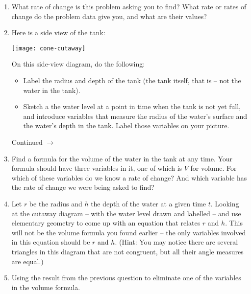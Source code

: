 \documentclass[11pt]{article}
\def\ra{\rightarrow}
\def\pageturn{\vfill 
\begin{flushright}
	\begin{small}
		Continued $\ra$
	\end{small}
\end{flushright} \newpage}
\begin{document}
	
\begin{enumerate}
	\item What rate of change is this problem asking you to find? What rate or rates of change do the problem data give you, and what are their values? 
	
	\vspace{0.7in}
	
	\item Here is a side view of the tank: 
\begin{center}
	\texttt{[image: cone-cutaway]}
\end{center}	
	
	
On this side-view diagram, do the following: 
	\begin{itemize}
		\item Label the radius and depth of the tank (the tank itself, that is -- not the water in the tank). 
		\item Sketch a the water level at a point in time when the tank is not yet full, and introduce variables that measure the radius of the water's surface and the water's depth in the tank. Label those variables on your picture. 
	\end{itemize}
	
	\pageturn

	
	\item Find a formula for the volume of the water in the tank at any time. Your formula should have three variables in it, one of which is $V$ for volume. For which of these variables do we know a rate of change? And which variable has the rate of change we were being asked to find? 
	
	\vspace{1in}
	
	\item Let $r$ be the radius and $h$ the depth of the water at a given time $t$. Looking at the cutaway diagram -- with the water level drawn and labelled -- and use elementary geometry to come up with an equation that relates $r$ and $h$. This will not be the volume formula you found earlier -- the only variables involved in this equation should be $r$ and $h$. (Hint: You may notice there are several triangles in this diagram that are not congruent, but all their angle measures are equal.) 
	
	\vspace{1in}
	
	\item Using the result from the previous question to eliminate one of the variables in the volume formula. 
	

\end{enumerate}
\end{document}
